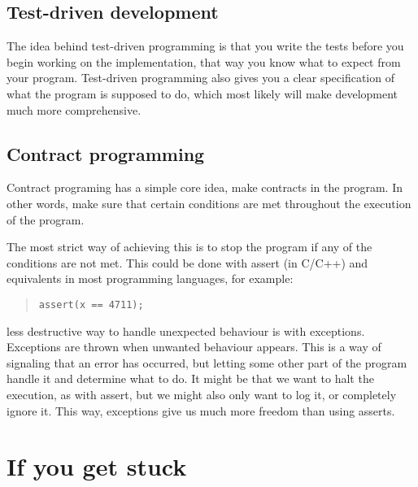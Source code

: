 \documentclass[11pt,a4paper,twoside]{article}
\begin{document}
\subsection{Test-driven development}

The idea behind test-driven programming is that you write the tests before you
begin working on the implementation, that way you know what to expect from your
program. Test-driven programming also gives you a clear specification of
what the program is supposed to do, which most likely will make development
much more comprehensive.


\subsection{Contract programming}

Contract programing has a simple core idea, make contracts in the program. In
other words, make sure that certain conditions are met throughout the execution
of the program.

The most strict way of achieving this is to stop the program if any of the
conditions are not met. This could be done with assert (in C/C++) and
equivalents in most programming languages, for example:

\begin{quote}
\begin{verbatim}
assert(x == 4711);
\end{verbatim}
\end{quote}

 less destructive way to handle unexpected behaviour is with exceptions.
Exceptions are thrown when unwanted behaviour appears. This is a way of
signaling that an error has occurred, but letting some other part of the
program handle it and determine what to do. It might be that we want to halt
the execution, as with assert, but we might also only want to log it, or
completely ignore it. This way, exceptions give us much more freedom than using
asserts.


\section{If you get stuck}
\end{document}
